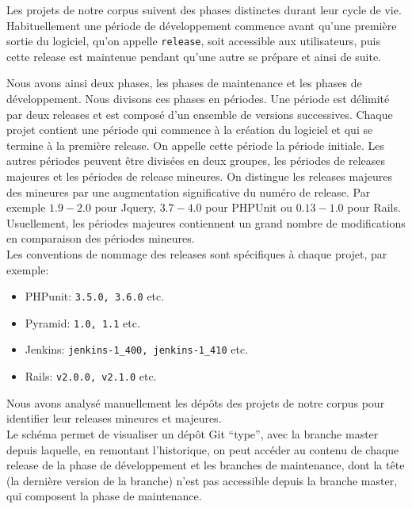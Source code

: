 Les projets de notre corpus suivent des phases distinctes durant leur cycle de vie. Habituellement une période de développement commence avant qu'une première sortie du logiciel, qu'on appelle \texttt{release}, soit accessible aux utilisateurs, puis cette release est maintenue pendant qu'une autre se prépare et ainsi de suite.

Nous avons ainsi deux phases, les phases de maintenance et les phases de développement. Nous divisons ces phases en périodes. Une période est délimité par deux releases et est composé d'un ensemble de versions successives. Chaque projet contient une période qui commence à la création du logiciel et qui se termine à la première release. On appelle cette période la période initiale. Les autres périodes peuvent être divisées en deux groupes, les périodes de releases majeures et les périodes de release mineures. On distingue les releases majeures des mineures par une augmentation significative du numéro de release. Par exemple $1.9-2.0$ pour Jquery, $3.7-4.0$ pour PHPUnit ou $0.13-1.0$ pour Rails. Usuellement, les périodes majeures contiennent un grand nombre de modifications en comparaison des périodes mineures.\\

Les conventions de nommage des releases sont spécifiques à chaque projet, par exemple:
\begin{itemize}
\item PHPunit: \texttt{3.5.0, 3.6.0} etc.
\item Pyramid: \texttt{1.0, 1.1} etc.
\item Jenkins: \texttt{jenkins-1\_400, jenkins-1\_410} etc.
\item Rails: \texttt{v2.0.0, v2.1.0} etc.
\end{itemize}
Nous avons analysé manuellement les dépôts des projets de notre corpus pour identifier leur releases mineures et majeures.\\

Le schéma  permet de visualiser un dépôt Git ``type'', avec la branche master depuis laquelle, en remontant l'historique, on peut accéder au contenu de chaque release de la phase de développement et les branches de maintenance, dont la tête (la dernière version de la branche) n'est pas accessible depuis la branche master, qui composent la phase de maintenance.\\

